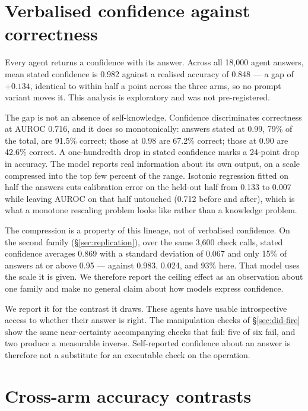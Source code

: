 \section{Verbalised confidence against correctness}
\label{app:confidence}

Every agent returns a confidence with its answer. Across all 18,000 agent answers, mean stated
confidence is 0.982 against a realised accuracy of 0.848 --- a gap of $+0.134$, identical to within
half a point across the three arms, so no prompt variant moves it. This analysis is exploratory and
was not pre-registered.

The gap is not an absence of self-knowledge. Confidence discriminates correctness at AUROC 0.716, and
it does so monotonically: answers stated at 0.99, 79\% of the total, are 91.5\% correct; those at
0.98 are 67.2\% correct; those at 0.90 are 42.6\% correct. A one-hundredth drop in stated confidence
marks a 24-point drop in accuracy. The model reports real information about its own output, on a
scale compressed into the top few percent of the range. Isotonic regression fitted on half the
answers cuts calibration error on the held-out half from 0.133 to 0.007 while leaving AUROC on that
half untouched (0.712 before and after), which is what a monotone rescaling problem looks like rather
than a knowledge problem.

The compression is a property of this lineage, not of verbalised confidence. On the second family
(\S\ref{sec:replication}), over the same 3,600 check calls, stated confidence averages 0.869 with a
standard deviation of 0.067 and only 15\% of answers at or above 0.95 --- against 0.983, 0.024, and
93\% here. That model uses the scale it is given. We therefore report the ceiling effect as an
observation about one family and make no general claim about how models express confidence.

We report it for the contrast it draws. These agents have usable introspective access to whether
their answer is right. The manipulation checks of \S\ref{sec:did-fire} show the same near-certainty
accompanying checks that fail: five of six fail, and two produce a measurable inverse. Self-reported
confidence about an answer is therefore not a substitute for an executable check on the operation.

\section{Cross-arm accuracy contrasts}
\label{app:cross-arm}

